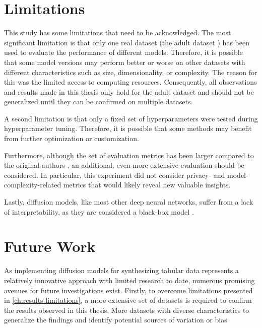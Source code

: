 \section{Limitations}
\label{ch:results-limitations}

This study has some limitations that need to be acknowledged. 
The most significant limitation is that only one real dataset (the adult dataset \cite{Dua:2019}) has been used to evaluate the performance of different models. 
Therefore, it is possible that some model versions may perform better or worse on other datasets with different characteristics such as size, dimensionality, or complexity. 
The reason for this was the limited access to computing resources.
Consequently, all observations and results made in this thesis only hold for the adult dataset and should not be generalized until they can be confirmed on multiple datasets.

A second limitation is that only a fixed set of hyperparameters were tested during hyperparameter tuning. 
Therefore, it is possible that some methods may benefit from further optimization or customization.

Furthermore, although the set of evaluation metrics has been larger compared to the original authors \cite{kotelnikov2022TabDDPMModellingTabular},
an additional, even more extensive evaluation should be considered. 
In particular, this experiment did not consider privacy- and model-complexity-related metrics that would likely reveal new valuable insights.

Lastly, diffusion models, like most other deep neural networks, suffer from a lack of interpretability, as they are considered a black-box model \cite{benitez1997AreArtificialNeural}.

\section{Future Work}
\label{ch:results-futureWork}

As implementing diffusion models for synthesizing tabular data represents a relatively innovative approach with limited research to date, numerous promising avenues for future investigations exist.
Firstly, to overcome limitations presented in \autoref{ch:results-limitations}, a more extensive set of datasets is required to confirm the results observed in this thesis.
More datasets with diverse characteristics to generalize the findings and identify potential sources of variation or bias

